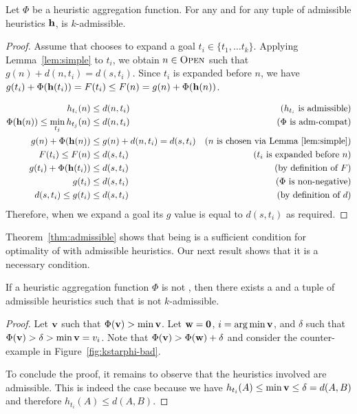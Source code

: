 \begin{theorem}
  \label{thm:admissible}
  Let $\Phi$ be a \axiomadm heuristic aggregation function.
  For any \kgs and for any tuple of admissible heuristics $\mathbf{h}$, \kastarphi is $k$-admissible.
\end{theorem}
\begin{proof}
  Assume that \kastarphi chooses to expand a goal $t_i\in\{t_1,\ldots t_k\}$.
  Applying Lemma~\ref{lem:simple} to $t_i$, we obtain $n\in \textsc{Open}$ such that $g(n) + d(n, t_i) = d(s, t_i)$.
  Since $t_i$ is expanded before $n$, we have $g(t_i) + \Phi(\mathbf{h}(t_i)) = F(t_i) \leq F(n) = g(n) + \Phi(\mathbf{h}(n))$.

  \begin{align}
    h_{t_i}(n) & \leq d(n,t_i) & \text{($h_{t_i}$ is admissible)}\\
    \Phi(\mathbf{h}(n)) \leq \min_{t_j} h_{t_j}(n) & \leq d(n, t_i) & \text{($\Phi$ is adm-compat)}\\
    g(n) + \Phi(\mathbf{h}(n)) & \leq g(n) + d(n, t_i) = d(s, t_i) & \text{($n$ is chosen via Lemma~\ref{lem:simple})}\\
    F(t_i) \leq F(n) & \leq d(s, t_i) & \text{($t_i$ is expanded before $n$)}\\
    g(t_i) + \Phi(\mathbf{h}(t_i)) & \leq d(s, t_i) & \text{(by definition of $F$)}\\
    g(t_i) & \leq d(s, t_i) & \text{($\Phi$ is non-negative)}\\
    d(s, t_i) \leq g(t_i) & \leq d(s, t_i) & \text{(by definition of $d$)}
  \end{align}
  Therefore, when we expand a goal its $g$ value is equal to $d(s,t_i)$ as required.
\end{proof}

Theorem~\ref{thm:admissible} shows that being \axiomadm is a sufficient condition for optimality of \kastarphi with admissible heuristics.
Our next result shows that it is a necessary condition.

\begin{theorem}
  \label{thm:admissible-dual}
  If a heuristic aggregation function $\Phi$ is not \axiomadm, then there exists a \kgs and a tuple of admissible heuristics such that \kastarphi is not $k$-admissible.
\end{theorem}
\begin{proof}
  Let $\mathbf{v}$ such that $\Phi(\mathbf{v}) > \min \mathbf{v}$.
  Let $\mathbf{w} = \mathbf{0}$, $i = \operatorname*{arg\,min} \mathbf{v}$, and $\delta$ such that $\Phi(\mathbf{v}) > \delta > \min \mathbf{v} = v_i$.
  Note that $\Phi(\mathbf{v}) > \Phi(\mathbf{w}) + \delta$ and consider the counter-example in Figure~\ref{fig:kstarphi-bad}.

  To conclude the proof, it remains to observe that the heuristics involved are admissible.
  This is indeed the case because we have $h_{t_i}(A) \leq \min \mathbf{v} \leq \delta = d(A, B)$ and therefore $h_{t_i}(A) \leq d(A, B)$.
\end{proof}

